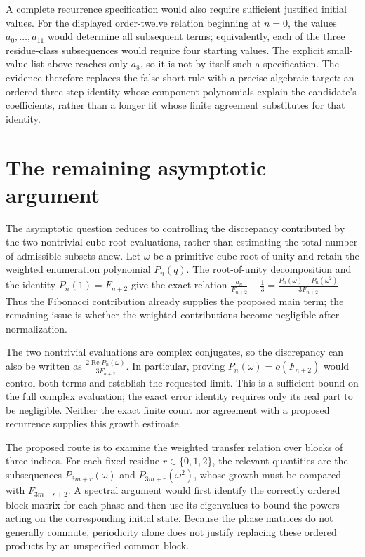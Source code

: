 \documentclass[11pt]{article}
\begin{document}
A complete recurrence specification would also require sufficient justified initial values. For the displayed order-twelve relation beginning at $n=0$, the values $a_0,\ldots,a_{11}$ would determine all subsequent terms; equivalently, each of the three residue-class subsequences would require four starting values. The explicit small-value list above reaches only $a_8$, so it is not by itself such a specification. The evidence therefore replaces the false short rule with a precise algebraic target: an ordered three-step identity whose component polynomials explain the candidate’s coefficients, rather than a longer fit whose finite agreement substitutes for that identity.

\section{The remaining asymptotic argument}
The asymptotic question reduces to controlling the discrepancy contributed by the two nontrivial cube-root evaluations, rather than estimating the total number of admissible subsets anew. Let $\omega$ be a primitive cube root of unity and retain the weighted enumeration polynomial $P_n(q)$. The root-of-unity decomposition and the identity $P_n(1)=F_{n+2}$ give the exact relation $\displaystyle \frac{a_n}{F_{n+2}}-\frac13=\frac{P_n(\omega)+P_n(\omega^2)}{3F_{n+2}}$. Thus the Fibonacci contribution already supplies the proposed main term; the remaining issue is whether the weighted contributions become negligible after normalization.

The two nontrivial evaluations are complex conjugates, so the discrepancy can also be written as $\displaystyle \frac{2\operatorname{Re}P_n(\omega)}{3F_{n+2}}$. In particular, proving $P_n(\omega)=o(F_{n+2})$ would control both terms and establish the requested limit. This is a sufficient bound on the full complex evaluation; the exact error identity requires only its real part to be negligible. Neither the exact finite count nor agreement with a proposed recurrence supplies this growth estimate.

The proposed route is to examine the weighted transfer relation over blocks of three indices. For each fixed residue $r\in\{0,1,2\}$, the relevant quantities are the subsequences $P_{3m+r}(\omega)$ and $P_{3m+r}(\omega^2)$, whose growth must be compared with $F_{3m+r+2}$. A spectral argument would first identify the correctly ordered block matrix for each phase and then use its eigenvalues to bound the powers acting on the corresponding initial state. Because the phase matrices do not generally commute, periodicity alone does not justify replacing these ordered products by an unspecified common block.
\end{document}
